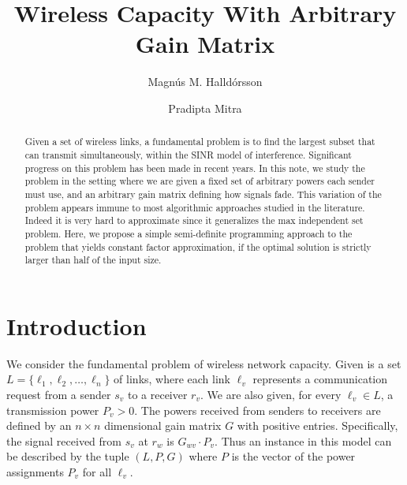 \documentclass[11pt]{amsart}
\begin{document}
\title[Wireless Capacity With Arbitrary Gain Matrix]{Wireless Capacity With Arbitrary Gain Matrix}


\author[M. Halld\'orsson]{Magn\'us M. Halld\'orsson}
\address[M. Halld\'orsson]{School of Computer Science\\
Reykjavik University\\
Reykjavik 101, Iceland}

\author[P. Mitra]{Pradipta Mitra}
\address[P. Mitra]{School of Computer Science\\
Reykjavik University\\
Reykjavik 101, Iceland}



\begin{abstract}
Given a set of wireless links, a fundamental problem is to find the largest subset that can transmit simultaneously, within the SINR model of interference. Significant progress on this problem has been made in recent years. In this note, we study the problem in the setting where we are given a fixed set of arbitrary powers each sender must use, and an arbitrary gain matrix defining how signals fade. This variation of the problem
appears immune to most algorithmic approaches studied in the literature. Indeed it is very hard to approximate since 
it generalizes the max independent set problem.
Here, we propose a simple semi-definite programming approach to the problem that yields constant factor approximation, if the optimal solution is  strictly larger than half of the input size.
\end{abstract}

\maketitle

\section{Introduction}
We consider the fundamental problem of wireless network capacity.
Given is a set
$L = \{\ell_1, \ell_2, \ldots, \ell_n\}$ of links, where
each link $\ell_v$ represents a communication request from a sender
$s_v$ to a receiver $r_v$.  We are also given,
for every $\ell_v \in L$, a transmission power $P_v > 0$. 
The powers received from senders to receivers are defined by an $n \times n$ dimensional gain matrix $G$ with positive entries. Specifically, the signal received from $s_v$ at $r_w$ is $G_{wv} \cdot P_v$. Thus an instance in this model
can be described by the tuple $(L, P, G)$ where $P$ is the vector of the power assignments $P_v$ for all $\ell_v$.
\end{document}
